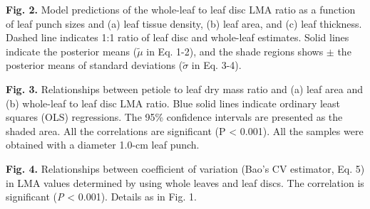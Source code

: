 \documentclass[
  12pt,
  a4paper,
,tablecaptionabove
]{scrartcl}
\begin{document}
\textbf{Fig. 2.}
Model predictions of the whole-leaf to leaf disc LMA ratio as a function of leaf punch sizes and (a) leaf tissue density, (b) leaf area, and (c) leaf thickness.
Dashed line indicates 1:1 ratio of leaf disc and whole-leaf estimates.
Solid lines indicate the posterior means (\(\tilde{\mu}\) in Eq. 1-2), and the shade regions shows \(\pm\) the posterior means of standard deviations (\(\tilde{\sigma}\) in Eq. 3-4).

\textbf{Fig. 3.}
Relationships between petiole to leaf dry mass ratio and (a) leaf area and (b) whole-leaf to leaf disc LMA ratio.
Blue solid lines indicate ordinary least squares (OLS) regressions.
The 95\% confidence intervals are presented as the shaded area.
All the correlations are significant (P \textless{} 0.001).
All the samples were obtained with a diameter 1.0-cm leaf punch.

\textbf{Fig. 4.}
Relationships between coefficient of variation (Bao's CV estimator, Eq. 5) in LMA values determined by using whole leaves and leaf discs.
The correlation is significant (\emph{P} \textless{} 0.001).
Details as in Fig. 1.
\end{document}

